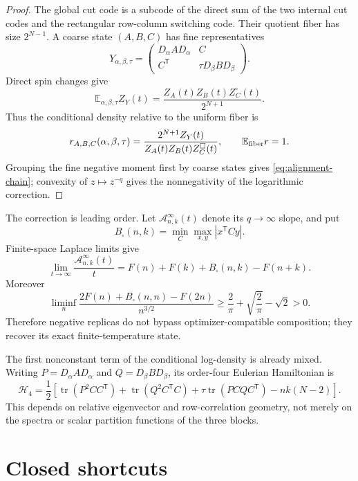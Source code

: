 \documentclass[11pt]{article}
\newcommand{\E}{\mathbb E}
\newcommand{\T}{\mathsf T}
\newcommand{\cA}{\mathcal A}
\newcommand{\tr}{\operatorname{tr}}
\theoremstyle{definition}
\theoremstyle{remark}
\begin{document}
\begin{proof}
The global cut code is a subcode of the direct sum of the two internal cut
codes and the rectangular row-column switching code.  Their quotient fiber
has size $2^{N-1}$.  A coarse state $(A,B,C)$ has fine representatives
\[
 Y_{\alpha,\beta,\tau}=\begin{pmatrix}
 D_\alpha AD_\alpha&C\\C^{\T}&\tau D_\beta BD_\beta
 \end{pmatrix}.
\]
Direct spin changes give
\[
 \E_{\alpha,\beta,\tau}Z_Y(t)
 =\frac{Z_A(t)Z_B(t)Z_C^\square(t)}{2^{N+1}}.
\]
Thus the conditional density relative to the uniform fiber is
\[
 r_{A,B,C}(\alpha,\beta,\tau)=
 \frac{2^{N+1}Z_Y(t)}{Z_A(t)Z_B(t)Z_C^\square(t)},
 \qquad\E_{\rm fiber}r=1.
\]
Grouping the fine negative moment first by coarse states gives
\eqref{eq:alignment-chain}; convexity of $z\mapsto z^{-q}$ gives the
nonnegativity of the logarithmic correction.
\end{proof}

The correction is leading order.  Let $\cA_{n,k}^{\infty}(t)$ denote its
$q\to\infty$ slope, and put
\[
 B_\square(n,k)=\min_C\max_{x,y}|x^{\T}Cy|.
\]
Finite-space Laplace limits give
\begin{equation}
 \lim_{t\to\infty}\frac{\cA_{n,k}^{\infty}(t)}t
 =F(n)+F(k)+B_\square(n,k)-F(n+k).                     \label{eq:alignment-slope}
\end{equation}
Moreover
\[
 \liminf_n\frac{2F(n)+B_\square(n,n)-F(2n)}{n^{3/2}}
 \ge\frac2\pi+\sqrt{\frac2\pi}-\sqrt2>0.
\]
Therefore negative replicas do not bypass optimizer-compatible composition;
they recover its exact finite-temperature state.

The first nonconstant term of the conditional log-density is already mixed.
Writing $P=D_\alpha AD_\alpha$ and $Q=D_\beta BD_\beta$, its order-four
Eulerian Hamiltonian is
\begin{equation}
 \mathcal H_4=\frac12\left[
 \tr(P^2CC^{\T})+\tr(Q^2C^{\T}C)
 +\tau\tr(PCQC^{\T})-nk(N-2)\right].                  \label{eq:H4}
\end{equation}
This depends on relative eigenvector and row-correlation geometry, not merely
on the spectra or scalar partition functions of the three blocks.

\section{Closed shortcuts}
\end{document}
